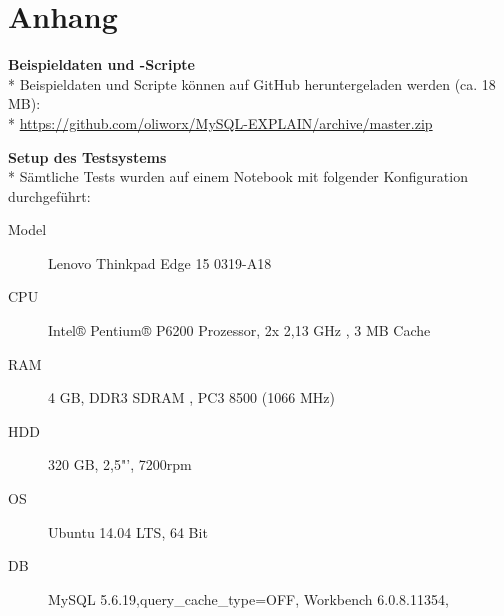 \newpage
\section{Anhang}
\appendix
\textbf{Beispieldaten und -Scripte}\\*
Beispieldaten und Scripte können auf GitHub heruntergeladen werden (ca. 18 MB):\\*
\url{https://github.com/oliworx/MySQL-EXPLAIN/archive/master.zip}

\textbf{Setup des Testsystems}\\*
Sämtliche Tests wurden auf einem Notebook mit folgender Konfiguration durchgeführt:
\begin{description}
  \item[Model] Lenovo Thinkpad Edge 15 0319-A18
  \item[CPU] Intel® Pentium® P6200 Prozessor, 2x 2,13 GHz , 3 MB Cache
  \item[RAM] 4 GB, DDR3 SDRAM , PC3 8500 (1066 MHz)
  \item[HDD] 320 GB, 2,5"', 7200rpm
  \item[OS] Ubuntu 14.04 LTS, 64 Bit
  \item[DB] MySQL 5.6.19,query\_cache\_type=OFF, Workbench 6.0.8.11354, 
\end{description}